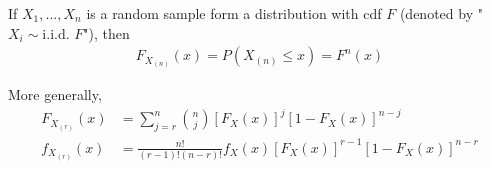 \documentclass[11pt]{elegantbook}
\begin{document}
\begin{proposition}[Distribution of $X_{n}=\max_{i=1,...,n}X_i$]
    If $X_1,...,X_n$ is a random sample form a distribution with cdf $F$ (denoted by "$X_i\sim \text{i.i.d. } F$"), then
    \begin{equation}
        \begin{aligned}
            F_{X_{(n)}}(x)=P(X_{(n)}\leq x)=F^n(x)
        \end{aligned}
        \nonumber
    \end{equation}
\end{proposition}
\begin{proposition}
    More generally,
    \begin{equation}
        \begin{aligned}
            F_{X_{(r)}}(x)&=\sum _{j=r}^{n}{\binom {n}{j}}[F_{X}(x)]^{j}[1-F_{X}(x)]^{n-j}\\
            f_{X_{(r)}}(x)&={\frac {n!}{(r-1)!(n-r)!}}f_{X}(x)[F_{X}(x)]^{r-1}[1-F_{X}(x)]^{n-r}
        \end{aligned}
        \nonumber
    \end{equation}
\end{proposition}
\end{document}
